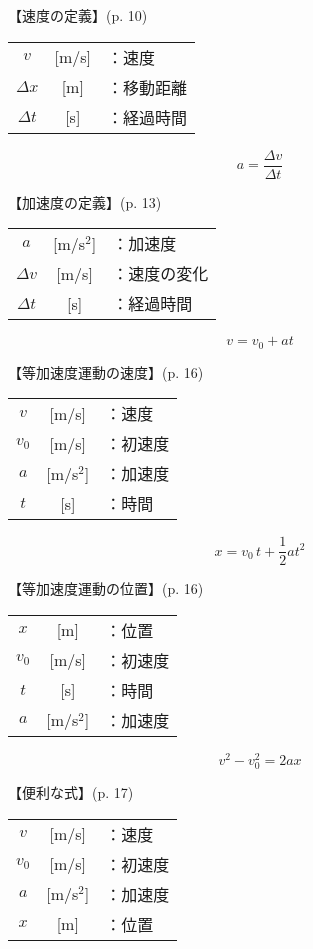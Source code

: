 \documentclass[10pt]{jarticle}
\begin{document}
\vskip3mm
【速度の定義】{\footnotesize (p. 10)}

\begin{tabular}{ccl}
$v$	&[m/s]	&：速度\\
$\mathit{\Delta} x$	&[m]	&：移動距離\\
$\mathit{\Delta} t$	&[s]	&：経過時間
\end{tabular}



\newpage
\[
	a = \frac{\mathit{\Delta} v}{\mathit{\Delta} t}
\]


\vskip3mm
【加速度の定義】{\footnotesize (p. 13)}

\begin{tabular}{ccl}
$a$	&[m/s$^2$]	&：加速度\\
$\mathit{\Delta} v$	&[m/s]	&：速度の変化\\
$\mathit{\Delta} t$	&[s]	&：経過時間
\end{tabular}




\newpage
\[
	v = v_0 + a t
\]


\vskip3mm
【等加速度運動の速度】{\footnotesize (p. 16)}

\begin{tabular}{ccl}
$v$	&[m/s]	&：速度\\
$v_0$	&[m/s]	&：初速度\\
$a$	&[m/s$^2$]	&：加速度\\
$t$	&[s]	&：時間
\end{tabular}




\newpage
\[
	x = v_0\, t + \frac{1}{2} a t^2
\]


\vskip3mm
【等加速度運動の位置】{\footnotesize (p. 16)}

\begin{tabular}{ccl}
$x$	&[m]	&：位置\\
$v_0$	&[m/s]	&：初速度\\
$t$	&[s]	&：時間\\
$a$	&[m/s$^2$]	&：加速度
\end{tabular}





\newpage
\[
	v^2 - v_0^2 = 2 a x
\]


\vskip3mm
【便利な式】{\footnotesize (p. 17)}

\begin{tabular}{ccl}
$v$	&[m/s]	&：速度\\
$v_0$	&[m/s]	&：初速度\\
$a$	&[m/s$^2$]	&：加速度\\
$x$	&[m]	&：位置
\end{tabular}
\end{document}
